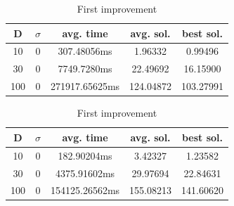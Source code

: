 \documentclass{article}
\begin{document}
\begin{table}[htbp]
\begin{minipage}{.4\linewidth}
    \centering
    
    \begin{tabular}{|c|c|c|c|c|}
    \hline
    D   & $\sigma$  & avg. time     & avg. sol.     & best sol.\\
    \hline
    10  & 0         & 307.48056ms   & 1.96332       & 0.99496 \\
    \hline
    30  & 0         & 7749.7280ms   & 22.49692      & 16.15900 \\
    \hline
    100 & 0         & 271917.65625ms& 124.04872     & 103.27991 \\
    \hline
    \end{tabular}
    \caption{Best improvement}
  \end{minipage}%
  \quad %
  \begin{minipage}{.75\linewidth}
    \centering
    
    \begin{tabular}{|c|c|c|c|c|}
    \hline
    D   & $\sigma$  & avg. time     & avg. sol.     & best sol. \\
    \hline
    10  & 0         & 182.90204ms   & 3.42327       & 1.23582 \\
    \hline
    30  & 0         & 4375.91602ms  & 29.97694      & 22.84631 \\
    \hline
    100 & 0         & 154125.26562ms& 155.08213     & 141.60620 \\
    \hline
    \end{tabular}
    \caption{First improvement}
  \end{minipage}
\end{table}
\end{document}
